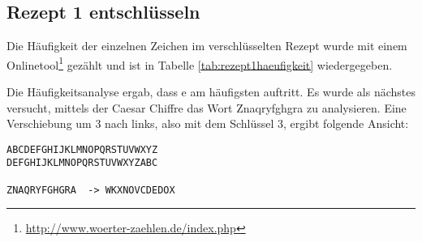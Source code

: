 \subsection{Rezept 1 entschlüsseln}
\label{RezeptEinsEntschluesseln}

{\tiny

}

Die Häufigkeit der einzelnen Zeichen im verschlüsselten Rezept wurde mit einem
Onlinetool\footnote{\url{http://www.woerter-zaehlen.de/index.php}} gezählt und
ist in Tabelle \ref{tab:rezept1haeufigkeit} wiedergegeben.

Die Häufigkeitsanalyse ergab, dass \glqq{}e\grqq{} am häufigsten auftritt.
Es wurde als nächstes versucht, mittels der Caesar Chiffre das Wort
\glqq{}Znaqryfghgra\grqq{} zu analysieren. Eine Verschiebung um 3 nach links,
also mit dem Schlüssel 3, ergibt folgende Ansicht:

\begin{lstlisting}
ABCDEFGHIJKLMNOPQRSTUVWXYZ
DEFGHIJKLMNOPQRSTUVWXYZABC

ZNAQRYFGHGRA  -> WKXNOVCDEDOX
\end{lstlisting}

